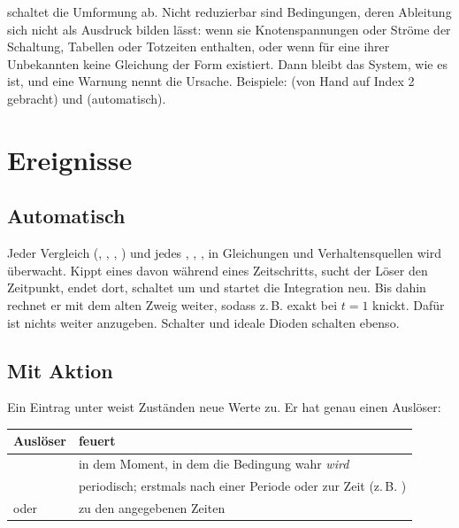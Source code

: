  schaltet die Umformung ab.
Nicht reduzierbar sind Bedingungen, deren Ableitung sich nicht als Ausdruck
bilden lässt: wenn sie Knotenspannungen oder Ströme der Schaltung, Tabellen
oder Totzeiten enthalten, oder wenn für eine ihrer Unbekannten keine
Gleichung der Form  existiert. Dann bleibt das System,
wie es ist, und eine Warnung nennt die Ursache. Beispiele:
 (von Hand auf Index 2 gebracht) und
 (automatisch).

\section{Ereignisse}
\label{sec:ereignisse}

\subsection*{Automatisch}

Jeder Vergleich (\code{<}, \code{<=}, \code{>}, \code{>=}) und jedes
, , ,  in Gleichungen und
Verhaltensquellen wird überwacht. Kippt eines davon während eines
Zeitschritts, sucht der Löser den Zeitpunkt, endet dort, schaltet um und
startet die Integration neu. Bis dahin rechnet er mit dem alten Zweig
weiter, sodass z.\,B.  exakt bei $t = 1$
knickt. Dafür ist nichts weiter anzugeben. Schalter und ideale Dioden
schalten ebenso.

\subsection*{Mit Aktion}

Ein Eintrag unter  weist Zuständen neue Werte zu. Er hat
genau einen Auslöser:

\begin{center}
\begin{tabularx}{\textwidth}{@{}lL@{}}
  \toprule
  Auslöser & feuert \\
  \midrule
   & in dem Moment, in dem die Bedingung wahr \emph{wird} \\
   & periodisch; erstmals nach einer Periode oder zur Zeit  (z.\,B. ) \\
   oder  & zu den angegebenen Zeiten \\
  \bottomrule
\end{tabularx}
\end{center}

